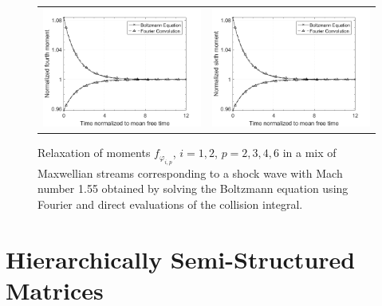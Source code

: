 \documentclass[12pt]{CSUNthesis}
\begin{document}
\begin{center}
\begin{figure}[h]
\begin{tabular}{@{}cc@{}}
  \includegraphics[height=.25\textheight]{images/reles_m155_5s15n_mom4.png}&
  \includegraphics[height=.25\textheight]{images/reles_m155_5s15n_mom6.png}\\
  \end{tabular}
\caption{\label{fig:rel} Relaxation of moments $f_{\varphi_{i,p}}$, $i=1,2$, $p=2,3,4,6$ 
in a mix of Maxwellian streams corresponding to a shock wave with 
Mach number 1.55 obtained by solving the Boltzmann equation using Fourier and direct evaluations of the collision integral.}
\end{figure}
\end{center}

\chapter{Hierarchically Semi-Structured Matrices}
\end{document}
